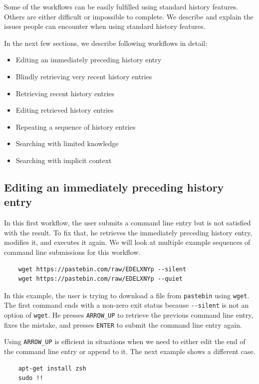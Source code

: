 Some of the workflows can be easily fulfilled using standard history features. Others are either difficult or impossible to complete. We describe and explain the issues people can encounter when using standard history features. 

\newpage
In the next few sections, we describe following workflows in detail:


\begin{itemize}
    \item Editing an immediately preceding history entry
    \item Blindly retrieving very recent history entries
    \item Retrieving recent history entries
    \item Editing retrieved history entries
    \item Repeating a sequence of history entries
    \item Searching with limited knowledge
    \item Searching with implicit context
\end{itemize}


\subsection{Editing an immediately preceding history entry}

In this first workflow, the user submits a command line entry but is not satisfied with the result. To fix that, he retrieves the immediately preceding history entry, modifies it, and executes it again. We will look at multiple example sequences of command line submissions for this workflow.

\begin{verbatim}
    wget https://pastebin.com/raw/EDELXNYp --silent
    wget https://pastebin.com/raw/EDELXNYp --quiet
\end{verbatim}
In this example, the user is trying to download a file from \verb|pastebin| using \verb|wget|. The first command ends with a non-zero exit status because \verb|--silent| is not an option of \verb|wget|. He presses \verb|ARROW_UP| to retrieve the previous command line entry, fixes the mistake, and presses \verb|ENTER| to submit the command line entry again. 

Using \verb|ARROW_UP| is efficient in situations when we need to either edit the end of the command line entry or append to it.
The next example shows a different case.

\begin{verbatim}
    apt-get install zsh
    sudo !!
\end{verbatim}

